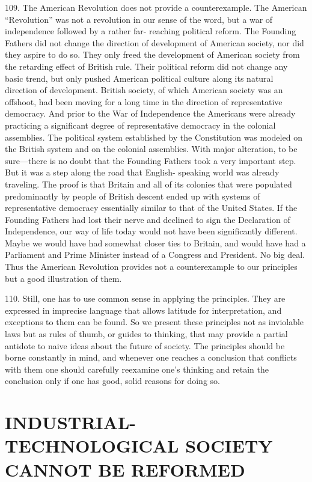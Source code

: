 \documentclass{article}
\begin{document}
109. The American Revolution does not provide a counterexample. The American “Revolution” 
was not a revolution in our sense of the word, but a war of independence followed by a rather far-
reaching political reform. The Founding Fathers did not change the direction of development of 
American society, nor did they aspire to do so. They only freed the development of American 
society from the retarding effect of British rule. Their political reform did not change any basic 
trend, but only pushed American political culture along its natural direction of 
development. British society, of which American society was an offshoot, had been moving for a 
long time in the direction of representative democracy. And prior to the War of Independence the 
Americans were already practicing a significant degree of representative democracy in the colonial 
assemblies. The political system established by the Constitution was modeled on the British 
system and on the colonial assemblies. With major alteration, to be sure—there is no doubt that 
the Founding Fathers took a very important step. But it was a step along the road that English-
speaking world was already traveling. The proof is that Britain and all of its colonies that were 
populated predominantly by people of British descent ended up with systems of representative 
democracy essentially similar to that of the United States. If the Founding Fathers had lost their 
nerve and declined to sign the Declaration of Independence, our way of life today would not have 
been significantly different. Maybe we would have had somewhat closer ties to Britain, and would 
have had a Parliament and Prime Minister instead of a Congress and President. No big deal. Thus 
the American Revolution provides not a counterexample to our principles but a good illustration 
of them. \vspace{\baselineskip} \newpage

110. Still, one has to use common sense in applying the principles. They are expressed in 
imprecise language that allows latitude for interpretation, and exceptions to them can be found. So 
we present these principles not as inviolable laws but as rules of thumb, or guides to thinking, that 
may provide a partial antidote to naive ideas about the future of society. The principles should be 
borne constantly in mind, and whenever one reaches a conclusion that conflicts with them one 
should carefully reexamine one’s thinking and retain the conclusion only if one has good, solid 
reasons for doing so. 


\section{INDUSTRIAL-TECHNOLOGICAL SOCIETY CANNOT BE REFORMED}
\end{document}

